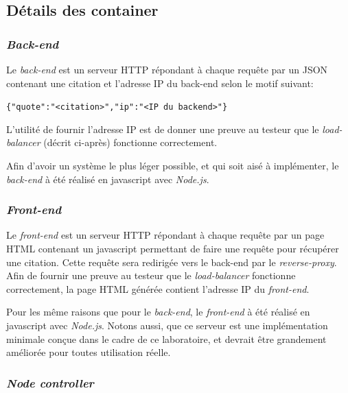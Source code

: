 \documentclass[a4paper,11pt,titlepage]{article}
\begin{document}
\subsection{Détails des container}
\subsubsection{\emph{Back-end}}
Le \emph{back-end} est un serveur HTTP répondant à chaque requête par un JSON contenant une citation et
l'adresse IP du back-end selon le motif suivant:
\begin{center}
\texttt{\{"quote":"<citation>","ip":"<IP du backend>"\}}
\end{center}
L'utilité de fournir l'adresse IP est de donner une preuve au testeur que le \emph{load-balancer} (décrit ci-après)
fonctionne correctement.

Afin d'avoir un système le plus léger possible, et qui soit aisé à implémenter, le \emph{back-end} à été réalisé en
javascript avec \emph{Node.js}.

\subsubsection{\emph{Front-end}}
Le \emph{front-end} est un serveur HTTP répondant à chaque requête par un page HTML contenant un javascript permettant
de faire une requête pour récupérer une citation. Cette requête sera redirigée vers le back-end par le
\emph{reverse-proxy}. Afin de fournir une preuve au testeur que le \emph{load-balancer} fonctionne correctement, la page
HTML générée contient l'adresse IP du \emph{front-end}.

Pour les même raisons que pour le \emph{back-end}, le \emph{front-end} à été réalisé en javascript avec \emph{Node.js}.
Notons aussi, que ce serveur est une implémentation minimale conçue dans le cadre de ce laboratoire, et devrait être
grandement améliorée pour toutes utilisation réelle.

\subsubsection{\emph{Node controller}}
\end{document}
